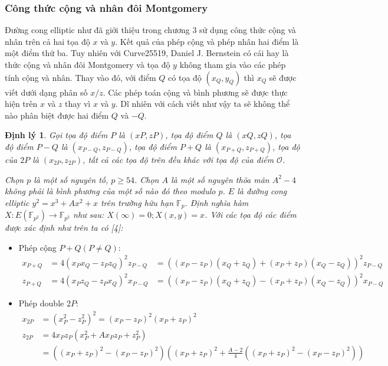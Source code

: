 \documentclass[a4paper,12pt]{report}
\newtheorem{theorem}{Định lý}[chapter]
\begin{document}
\subsubsection{Công thức cộng và nhân đôi Montgomery}
Đường cong elliptic như đã giới thiệu trong chương 3 sử dụng công thức cộng và nhân trên cả hai tọa độ $x$ và $y$. Kết quả của phép cộng và phép nhân hai điểm là một điểm thứ ba. Tuy nhiên với Curve25519, Daniel J. Bernstein có cái hay là thức cộng và nhân đôi Montgomery và tọa độ $y$ không tham gia vào các phép tính cộng và nhân. Thay vào đó, với điểm $Q$ có tọa độ
$(x_Q, y_Q)$ thì $x_Q$ sẽ được viết dưới dạng phân số $x/z$. Các phép toán cộng và bình phương sẽ được thực hiện trên $x$ và $z$ thay vì $x$ và $y$. Dĩ nhiên với cách viết như vậy ta sẽ không thể nào phân biệt được hai điểm $Q$ và $-Q$.
\begin{theorem}
Gọi tọa độ điểm $P$ là $(xP, zP)$, tọa độ điểm $Q$ là $(xQ, zQ)$, tọa độ điểm $P - Q$ là $(x_{P-Q}, z_{P-Q})$, tọa độ điểm $P + Q$ là $(x_{P+Q}, z_{P+Q})$, tọa độ của $2P$ là $(x_{2P}, z_{2P})$, tất cả các tọa độ trên đều khác với tọa độ của điểm $\mathcal{O}$.

Chọn $p$ là một số nguyên tố, $p \geq 54$. Chọn $A$ là một số nguyên thõa mãn $A^2 - 4$ không phải là bình phương của một số nào đó theo modulo $p$. $E$ là đường cong elliptic $y^2 = x^3 + Ax^2 + x$ trên trường hữu hạn $\mathbb{F}_p$. Định nghĩa hàm $X : E(\mathbb{F}_{p^2}) \rightarrow \mathbb{F}_{p^2}$ như sau: $X(\infty) = 0; X(x, y) = x$. Với các tọa độ các điểm được xác định như trên ta có [4]:
\end{theorem} 
\begin{itemize}
\item[] Phép cộng $P + Q (P \neq Q)$:
\begin{displaymath}
\begin{aligned}
x_{P+Q} & = 4(x_P x_Q - z_Pz_Q)^2z_{P-Q} & = ((x_P - z_P)(x_Q + z_Q) + (x_P + z_P)(x_Q - z_Q))^2z_{P-Q} \\
z_{P+Q} & = 4(x_Pz_Q - z_Px_Q)^2x_{P-Q} & = ((x_P - z_P)(x_Q + z_Q) - (x_P + z_P)(x_Q - z_Q))^2x_{P-Q}
\end{aligned}
\end{displaymath}
\item[] Phép double $2P$:
\begin{displaymath}
\begin{aligned}
x_{2P} & = (x^2_P - z^2_P)^2  = (x_P - z_P)^2(x_P + z_P)^2 \\
z_{2P} & = 4x_Pz_P(x^2_P + Ax_Pz_P + z^2_P) \\ & = ((x_P + z_P)^2 - (x_P - z_P)^2)\left((x_P + z_P)^2 + \frac{A - 2}{4}((x_P + z_P)^2 - (x_P - z_P)^2) \right)
\end{aligned}
\end{displaymath}
\end{itemize}
\end{document}
